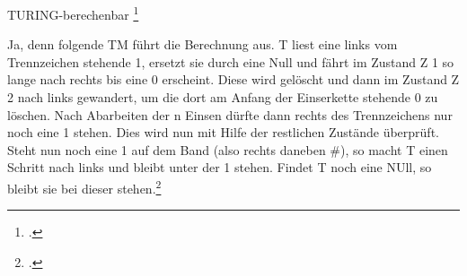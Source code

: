 \documentclass{bschlangaul-aufgabe}
\begin{document}

TURING-berechenbar
\footcite[Aufgabe 3]{theo:ab:4}

\begin{bAntwort}
Ja, denn folgende TM führt die Berechnung aus. T liest eine links vom
Trennzeichen stehende 1, ersetzt sie durch eine Null und fährt im
Zustand Z 1 so lange nach rechts bis eine 0 erscheint. Diese wird
gelöscht und dann im Zustand Z 2 nach links gewandert, um die dort am
Anfang der Einserkette stehende 0 zu löschen. Nach Abarbeiten der n
Einsen dürfte dann rechts des Trennzeichens nur noch eine 1 stehen. Dies
wird nun mit Hilfe der restlichen Zustände überprüft. Steht nun noch
eine 1 auf dem Band (also rechts daneben \#), so macht T einen Schritt
nach links und bleibt unter der 1 stehen. Findet T noch eine NUll, so
bleibt sie bei dieser stehen.\footcite[Seite 44, Aufgabe 8]{kiesmueller}
\end{bAntwort}
\end{document}
